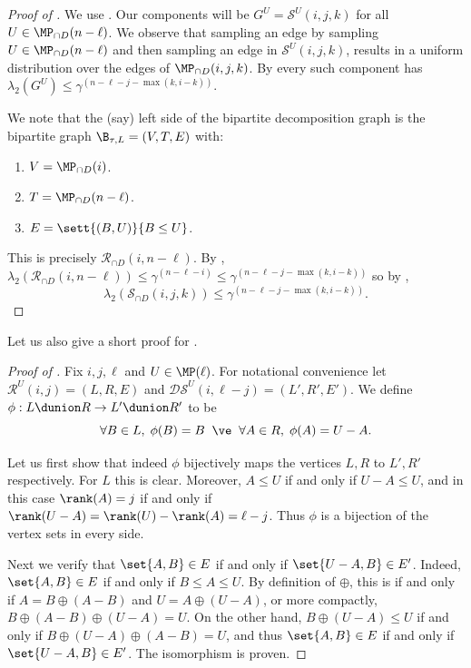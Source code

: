 \begin{proof}[Proof of ]
We use . Our components will be \(G^U = \mathcal{S}^U(i,j,k)\) for all \(U \in \MP_{\cap D}(n-\ell)\). We observe that sampling an edge by sampling \(U \in \MP_{\cap D}(n-\ell)\) and then sampling an edge in \(\mathcal{S}^U(i,j,k)\), results in a uniform distribution over the edges of \(\MP_{\cap D}(i,j,k)\). By  every such component has \(\lambda_2(G^U) \leq \gamma^{(n-\ell-j-\max(k,i-k))}\).

We note that the (say) left side of the bipartite decomposition graph is the bipartite graph \(\B_{\tau,L}=(V,T,E)\) with:
\begin{enumerate}
    \item \(V = \MP_{\cap D}(i)\).
    \item \(T = \MP_{\cap D}(n-\ell)\).
    \item \(E = \sett{(B,U)}{B \leq U}\).
\end{enumerate}
This is precisely \(\mathcal{R}_{\cap D}(i,n-\ell)\). By , \(\lambda_2(\mathcal{R}_{\cap D}(i,n-\ell)) \leq \gamma^{(n-\ell-i)}\leq \gamma^{(n-\ell-j-\max(k,i-k))}\) so by ,
\[\lambda_2(\mathcal{S}_{\cap D}(i,j,k)) \leq \gamma^{(n-\ell-j-\max(k,i-k))}.\]
\end{proof}

Let us also give a short proof for .
\begin{proof}[Proof of ]
    Fix \(i,j,\ell\) and \(U \in \MP(\ell)\). For notational convenience let \(\mathcal{R}^U(i,j) = (L,R,E)\) and \(\mathcal{DS}^U(i,\ell-j) = (L',R',E')\). We define 
    \(\phi:L \dunion R \to L' \dunion R'\) to be
    \[\forall B \in L, \; \phi(B) = B \; \; \ve \; \; \forall A \in R, \; \phi(A) = U-A.\]
    
    Let us first show that indeed \(\phi\) bijectively maps the vertices \(L,R\) to \(L',R'\) respectively. For \(L\) this is clear. Moreover, \(A \leq U\) if and only if \(U-A \leq U\), and in this case \(\rank(A) = j\) if and only if \(\rank(U-A) = \rank(U)-\rank(A)=\ell-j\). Thus \(\phi\) is a bijection of the vertex sets in every side.

    Next we verify that \(\set{A,B} \in E\) if and only if \(\set{U-A,B} \in E'\). Indeed, \(\set{A,B}\in E\) if and only if \(B \leq A \leq U\). By definition of \(\oplus\), this is if and only if \(A=B \oplus (A-B)\) and \(U=A \oplus (U-A)\), or more compactly, \(B \oplus (A-B) \oplus (U-A) = U\). On the other hand, \(B \oplus (U-A) \leq U\) if and only if \(B \oplus (U-A) \oplus (A-B) = U\), and thus \(\set{A,B} \in E\) if and only if \(\set{U-A,B} \in E'\). The isomorphism is proven.
\end{proof}

